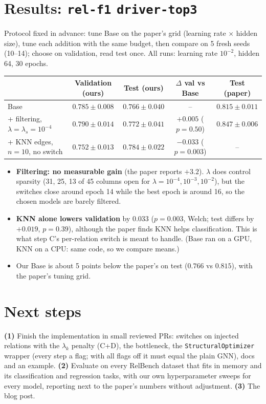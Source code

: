 \documentclass{article}
\newcommand{\code}[1]{\texttt{#1}}
\begin{document}
\section{Results: \code{rel-f1} \code{driver-top3}}
\vspace{-0.4em}
Protocol fixed in advance: tune Base on the paper's grid (learning rate $\times$ hidden size), tune
each addition with the same budget, then compare on 5 fresh seeds (10--14); choose on validation,
read test once. All runs: learning rate $10^{-2}$, hidden 64, 30 epochs.

\begin{center}
\vspace{-0.6em}
\small
\setlength{\tabcolsep}{4pt}
\begin{tabular}{@{}lcccc@{}}
\toprule
 & Validation (ours) & Test (ours) & $\Delta$ val vs Base & Test (paper) \\
\midrule
Base & $0.785 \pm 0.008$ & $0.766 \pm 0.040$ & -- & $0.815 \pm 0.011$ \\
+ filtering, $\lambda=\lambda_s=10^{-4}$ & $0.790 \pm 0.014$ & $0.772 \pm 0.041$ & $+0.005$ ($p=0.50$) & $0.847 \pm 0.006$ \\
+ KNN edges, $n=10$, no switch & $0.752 \pm 0.013$ & $0.784 \pm 0.022$ & $-0.033$ ($p=0.003$) & -- \\
\bottomrule
\end{tabular}
\vspace{-0.4em}
\end{center}
\begin{itemize}
\item \textbf{Filtering: no measurable gain} (the paper reports $+3.2$). $\lambda$ does control sparsity
  (31, 25, 13 of 45 columns open for $\lambda = 10^{-4}, 10^{-3}, 10^{-2}$), but the switches close
  around epoch 14 while the best epoch is around 16, so the chosen models are barely filtered.
\item \textbf{KNN alone lowers validation} by 0.033 ($p=0.003$, Welch; test differs by $+0.019$,
  $p=0.39$), although the paper finds KNN helps classification. This is what step C's per-relation
  switch is meant to handle. (Base ran on a GPU, KNN on a CPU: same code, so we compare means.)
\item Our Base is about 5 points below the paper's on test ($0.766$ vs $0.815$), with the paper's tuning grid.
\end{itemize}

\section{Next steps}
\vspace{-0.4em}
\textbf{(1)} Finish the implementation in small reviewed PRs: switches on injected relations with the
$\lambda_k$ penalty (C+D), the bottleneck, the \code{StructuralOptimizer} wrapper (every step a flag;
with all flags off it must equal the plain GNN), docs and an example. \textbf{(2)} Evaluate on every
RelBench dataset that fits in memory and its classification and regression tasks, with our own
hyperparameter sweeps for every model, reporting next to the paper's numbers without adjustment.
\textbf{(3)} The blog post.
\end{document}
